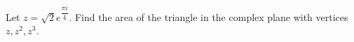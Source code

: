 Let $z=\sqrt2e^{\dfrac{\pi i}{4}}$. Find the area of the triangle in the complex plane with vertices $z,z^2,z^3$.
